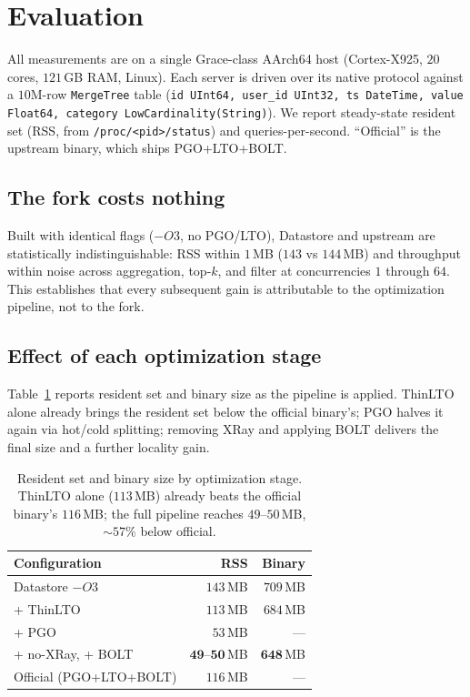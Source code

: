 \section{Evaluation}
\label{sec:eval}

All measurements are on a single Grace-class AArch64 host (Cortex-X925,
$20$ cores, $121$\,GB RAM, Linux). Each server is driven over its native
protocol against a $10$M-row \texttt{MergeTree} table
(\texttt{id UInt64, user\_id UInt32, ts DateTime, value Float64, category
LowCardinality(String)}). We report steady-state resident set (RSS, from
\texttt{/proc/<pid>/status}) and queries-per-second. ``Official'' is the
upstream binary, which ships PGO+LTO+BOLT.

\subsection{The fork costs nothing}

Built with identical flags ($-O3$, no PGO/LTO), Datastore and upstream are
statistically indistinguishable: RSS within $1$\,MB ($143$ vs $144$\,MB) and
throughput within noise across aggregation, top-$k$, and filter at concurrencies
$1$ through $64$. This establishes that every subsequent gain is attributable to
the optimization pipeline, not to the fork.

\subsection{Effect of each optimization stage}

Table~\ref{tab:stages} reports resident set and binary size as the pipeline is
applied. ThinLTO alone already brings the resident set below the official
binary's; PGO halves it again via hot/cold splitting; removing XRay and applying
BOLT delivers the final size and a further locality gain.

\begin{table}[H]
\centering
\small
\begin{tabular}{@{}lrr@{}}
\toprule
Configuration & RSS & Binary \\
\midrule
Datastore $-O3$            & $143$\,MB & $709$\,MB \\
\quad + ThinLTO            & $113$\,MB & $684$\,MB \\
\quad + PGO                & $53$\,MB  & --- \\
\quad + no-XRay, + BOLT    & $\mathbf{49}$--$\mathbf{50}$\,MB & $\mathbf{648}$\,MB \\
\midrule
Official (PGO+LTO+BOLT)    & $116$\,MB & --- \\
\bottomrule
\end{tabular}
\caption{Resident set and binary size by optimization stage. ThinLTO alone
($113$\,MB) already beats the official binary's $116$\,MB; the full pipeline
reaches $49$--$50$\,MB, $\sim\!57\%$ below official.}
\label{tab:stages}
\end{table}

